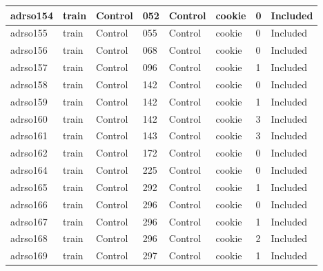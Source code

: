 \begin{center}
\begin{longtable}{|l|l|l|l|l|l|l|l|}
adrso154  & train            & Control      & 052         & Control              & cookie          & 0                & Included      \\ \hline
adrso155  & train            & Control      & 055         & Control              & cookie          & 0                & Included      \\ \hline
adrso156  & train            & Control      & 068         & Control              & cookie          & 0                & Included      \\ \hline
adrso157  & train            & Control      & 096         & Control              & cookie          & 1                & Included      \\ \hline
adrso158  & train            & Control      & 142         & Control              & cookie          & 0                & Included      \\ \hline
adrso159  & train            & Control      & 142         & Control              & cookie          & 1                & Included      \\ \hline
adrso160  & train            & Control      & 142         & Control              & cookie          & 3                & Included      \\ \hline
adrso161  & train            & Control      & 143         & Control              & cookie          & 3                & Included      \\ \hline
adrso162  & train            & Control      & 172         & Control              & cookie          & 0                & Included      \\ \hline
adrso164  & train            & Control      & 225         & Control              & cookie          & 0                & Included      \\ \hline
adrso165  & train            & Control      & 292         & Control              & cookie          & 1                & Included      \\ \hline
adrso166  & train            & Control      & 296         & Control              & cookie          & 0                & Included      \\ \hline
adrso167  & train            & Control      & 296         & Control              & cookie          & 1                & Included      \\ \hline
adrso168  & train            & Control      & 296         & Control              & cookie          & 2                & Included      \\ \hline
adrso169  & train            & Control      & 297         & Control              & cookie          & 1                & Included      \\ \hline

\end{longtable}
\end{center}
